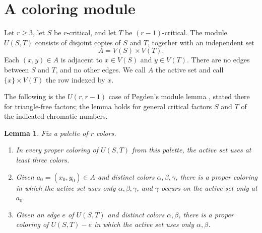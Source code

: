 \documentclass[11pt]{article}
\newtheorem{lemma}[theorem]{Lemma}
\numberwithin{equation}{section}
\begin{document}
\section{A coloring module}
\label{sec:module}

Let \(r\ge3\), let \(S\) be \(r\)-critical, and let \(T\) be
\((r-1)\)-critical.
The module \(U(S,T)\) consists of disjoint copies of \(S\) and \(T\),
together with an independent set
\[
 A=V(S)\times V(T).
\]
Each \((x,y)\in A\) is adjacent to \(x\in V(S)\) and
\(y\in V(T)\). There are no edges between \(S\) and \(T\), and
no other edges. We call \(A\) the active set and call
\(\{x\}\times V(T)\) the row indexed by \(x\).

The following is the \(U(r,r-1)\) case of Pegden's module lemma
\cite[Lemma~2.5]{Pegden}, stated there for triangle-free factors;
the lemma holds for general critical factors \(S\) and \(T\) of
the indicated chromatic numbers.

\begin{lemma}\label{lem:module}
Fix a palette of \(r\) colors.
\begin{enumerate}
\item In every proper coloring of \(U(S,T)\) from this palette,
the active set uses at least three colors.
\item Given \(a_0=(x_0,y_0)\in A\) and distinct colors
\(\alpha,\beta,\gamma\), there is a proper coloring in which
the active set uses only \(\alpha,\beta,\gamma\), and
\(\gamma\) occurs on the active set only at \(a_0\).
\item Given an edge \(e\) of \(U(S,T)\) and distinct colors
\(\alpha,\beta\), there is a proper coloring of \(U(S,T)-e\)
in which the active set uses only \(\alpha,\beta\).
\end{enumerate}
\end{lemma}
\end{document}
